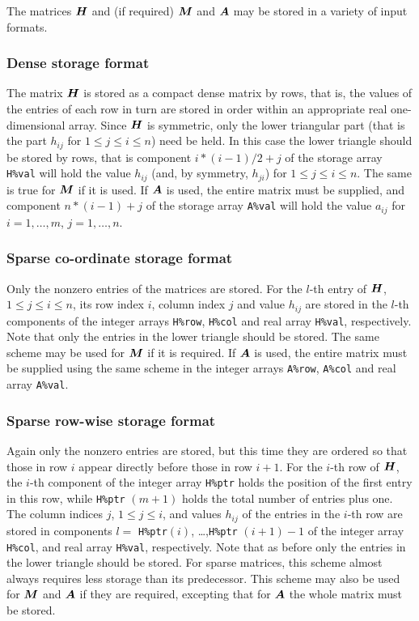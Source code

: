 \documentclass{galahad}
\begin{document}

\galmatrix
The matrices ${\bm{H}}$ and (if required) ${\bm{M}}$ and ${\bm{A}}$
may be stored in a variety of input formats.

\subsubsection{Dense storage format}\label{dense}
The matrix ${\bm{H}}$ is stored as a compact
dense matrix by rows, that is, the values of the entries of each row in turn are
stored in order within an appropriate real one-dimensional array.
Since ${\bm{H}}$ is symmetric, only the lower triangular part (that is the part
$h_{ij}$ for $1 \leq j \leq i \leq n$) need be held. In this case
the lower triangle should be stored by rows, that is
component $i \ast (i-1)/2 + j$ of the storage array {\tt H\%val}
will hold the value $h_{ij}$ (and, by symmetry, $h_{ji}$)
for $1 \leq j \leq i \leq n$. The same is true for ${\bm{M}}$ if it is used.
If ${\bm{A}}$ is used, the entire matrix must be supplied, and
component $n \ast (i-1) + j$ of the storage array {\tt A\%val} will hold the
value $a_{ij}$ for $i = 1, \ldots , m$, $j = 1, \ldots , n$.

\subsubsection{Sparse co-ordinate storage format}\label{coordinate}
Only the nonzero entries of the matrices are stored.
For the $l$-th entry of ${\bm{H}}$, $1 \leq j \leq i \leq n$,
its row index $i$, column index $j$ and value $h_{ij}$
are stored in the $l$-th components of the integer arrays {\tt H\%row},
{\tt H\%col} and real array {\tt H\%val}, respectively.
Note that only the entries in the lower triangle should be stored.
The same scheme may be used for ${\bm{M}}$ if it is required.
If ${\bm{A}}$ is used, the entire matrix must be supplied using the same scheme
in the integer arrays {\tt A\%row}, {\tt A\%col} and real array {\tt A\%val}.

\subsubsection{Sparse row-wise storage format}\label{rowwise}
Again only the nonzero entries are stored, but this time
they are ordered so that those in row $i$ appear directly before those
in row $i+1$. For the $i$-th row of ${\bm{H}}$, the $i$-th component of the
integer array {\tt H\%ptr} holds the position of the first entry in this row,
while {\tt H\%ptr} $(m+1)$ holds the total number of entries plus one.
The column indices $j$, $1 \leq j \leq i$, and values $h_{ij}$ of the
entries in the $i$-th row are stored in components
$l =$ {\tt H\%ptr}$(i)$, \ldots ,{\tt H\%ptr} $(i+1)-1$ of the
integer array {\tt H\%col}, and real array {\tt H\%val}, respectively.
Note that as before only the entries in the lower triangle should be stored.
For sparse matrices, this scheme almost always requires less storage than
its predecessor.
This scheme may also be used for ${\bm{M}}$ and ${\bm{A}}$ if they are required,
excepting that for ${\bm{A}}$ the whole matrix must be stored.
\end{document}
